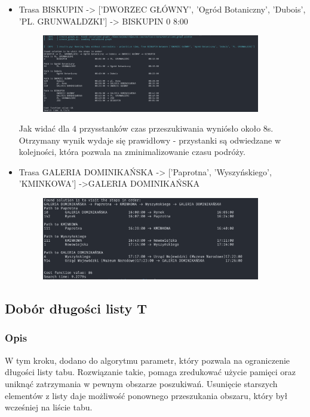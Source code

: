 \documentclass[a4paper, 12pt]{article}
\begin{document}
\begin{itemize}
    \item Trasa BISKUPIN -> ['DWORZEC GŁÓWNY', 'Ogród Botaniczny', 'Dubois', 'PL. GRUNWALDZKI'] -> BISKUPIN 0 8:00
  \begin{figure}[H]
    \centering
    \includegraphics[width=0.9\textwidth]{2024-04-08-07-36-38.png} 
  \end{figure}
  Jak widać dla 4 przysstanków czas przeszukiwania wyniósło około 8s.
  Otrzymany wynik wydaje się prawidłowy - przystanki są odwiedzane w kolejności,
  która pozwala na zminimalizowanie czasu podróży.


    \item Trasa GALERIA DOMINIKAŃSKA -> ['Paprotna', 'Wyszyńskiego', 'KMINKOWA'] ->GALERIA DOMINIKAŃSKA 
  \begin{figure}[H]
    \centering
    \includegraphics[width=0.9\textwidth]{2024-04-08-07-48-31.png} 
  \end{figure}
\end{itemize}


\subsection{Dobór długości listy T}
    \subsubsection{Opis}
    W tym kroku, dodano do algorytmu parametr, który pozwala na ograniczenie długości listy tabu.
    Rozwiązanie takie, pomaga zredukować użycie pamięci oraz uniknąć zatrzymania w pewnym obszarze poszukiwań.
    Usunięcie starszych elementów z listy daje możliwość ponownego przeszukania obszaru, który był wcześniej
    na liście tabu. 
\end{document}
